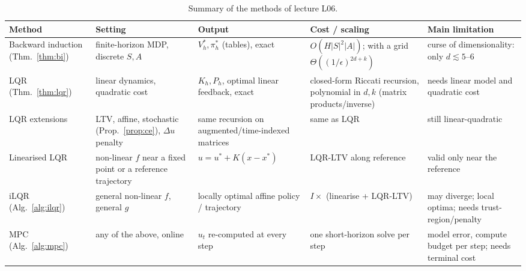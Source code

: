 \documentclass[11pt,a4paper]{article}
\theoremstyle{plain}
\theoremstyle{definition}
\theoremstyle{remark}
\begin{document}
\begin{table}[h]
\centering
\small
\renewcommand{\arraystretch}{1.25}
\begin{tabular}{@{}p{2.6cm}p{2.7cm}p{2.5cm}p{3.1cm}p{3.1cm}@{}}
\toprule
\textbf{Method} & \textbf{Setting} & \textbf{Output} & \textbf{Cost / scaling} & \textbf{Main limitation}\\
\midrule
Backward induction (Thm.~\ref{thm:bi}) & finite-horizon MDP, discrete $S,A$ & $V^*_h,\pi^*_h$ (tables), exact & $O(H|S|^2|A|)$; with a grid $\Theta((1/\epsilon)^{2d+k})$ & curse of dimensionality: only $d\lesssim5$--$6$\\
LQR (Thm.~\ref{thm:lqr}) & linear dynamics, quadratic cost & $K_h,P_h$, optimal linear feedback, exact & closed-form Riccati recursion, polynomial in $d,k$ (matrix products/inverse) & needs linear model and quadratic cost\\
LQR extensions & LTV, affine, stochastic (Prop.~\ref{prop:ce}), $\Delta u$ penalty & same recursion on augmented/time-indexed matrices & same as LQR & still linear-quadratic\\
Linearised LQR & non-linear $f$ near a fixed point or a reference trajectory & $u=u^*+K(x-x^*)$ & LQR-LTV along reference & valid only near the reference\\
iLQR (Alg.~\ref{alg:ilqr}) & general non-linear $f$, general $g$ & locally optimal affine policy / trajectory & $I\times$ (linearise + LQR-LTV) & may diverge; local optima; needs trust-region/penalty\\
MPC (Alg.~\ref{alg:mpc}) & any of the above, online & $u_t$ re-computed at every step & one short-horizon solve per step & model error, compute budget per step; needs terminal cost\\
\bottomrule
\end{tabular}
\caption{Summary of the methods of lecture L06.}
\end{table}
\end{document}
